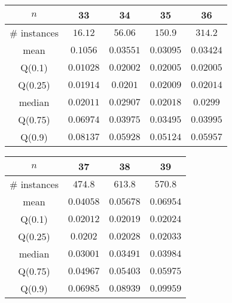 \begin{tabular}{c|cccc} 
\hline 
$n$ & 33 & 34 & 35 & 36 \tabularnewline 
\hline 
\hline 
\# instances & $16.12$ & $56.06$ & $150.9$ & $314.2$ \tabularnewline 
mean & $0.1056$ & $0.03551$ & $0.03095$ & $0.03424$ \tabularnewline 
Q(0.1) & $0.01028$ & $0.02002$ & $0.02005$ & $0.02005$ \tabularnewline 
Q(0.25) & $0.01914$ & $0.0201$ & $0.02009$ & $0.02014$ \tabularnewline 
median & $0.02011$ & $0.02907$ & $0.02018$ & $0.0299$ \tabularnewline 
Q(0.75) & $0.06974$ & $0.03975$ & $0.03495$ & $0.03995$ \tabularnewline 
Q(0.9) & $0.08137$ & $0.05928$ & $0.05124$ & $0.05957$ \tabularnewline 
\hline 
\end{tabular} 
\medskip{} 

\begin{tabular}{c|ccc} 
\hline 
$n$ & 37 & 38 & 39 \tabularnewline 
\hline 
\hline 
\# instances & $474.8$ & $613.8$ & $570.8$ \tabularnewline 
mean & $0.04058$ & $0.05678$ & $0.06954$ \tabularnewline 
Q(0.1) & $0.02012$ & $0.02019$ & $0.02024$ \tabularnewline 
Q(0.25) & $0.0202$ & $0.02028$ & $0.02033$ \tabularnewline 
median & $0.03001$ & $0.03491$ & $0.03984$ \tabularnewline 
Q(0.75) & $0.04967$ & $0.05403$ & $0.05975$ \tabularnewline 
Q(0.9) & $0.06985$ & $0.08939$ & $0.09959$ \tabularnewline 
\hline 
\end{tabular} 
\medskip{} 

